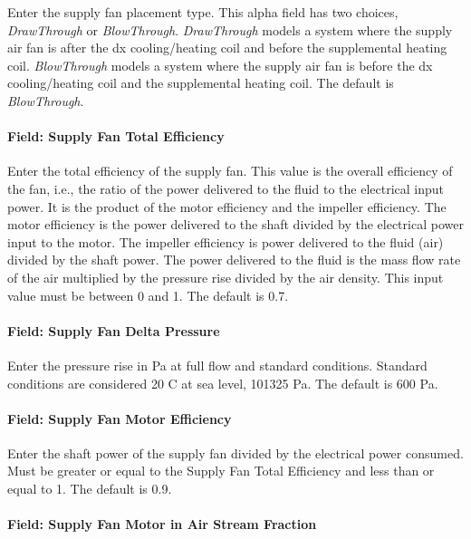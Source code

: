 Enter the supply fan placement type. This alpha field has two choices, \emph{DrawThrough} or \emph{BlowThrough}. \emph{DrawThrough} models a system where the supply air fan is after the dx cooling/heating coil and before the supplemental heating coil. \emph{BlowThrough} models a system where the supply air fan is before the dx cooling/heating coil and the supplemental heating coil. The default is \emph{BlowThrough}.

\paragraph{Field: Supply Fan Total Efficiency}\label{field-supply-fan-total-efficiency-6}

Enter the total efficiency of the supply fan. This value is the overall efficiency of the fan, i.e., the ratio of the power delivered to the fluid to the electrical input power. It is the product of the motor efficiency and the impeller efficiency. The motor efficiency is the power delivered to the shaft divided by the electrical power input to the motor. The impeller efficiency is power delivered to the fluid (air) divided by the shaft power. The power delivered to the fluid is the mass flow rate of the air multiplied by the pressure rise divided by the air density. This input value must be between 0 and 1. The default is 0.7.

\paragraph{Field: Supply Fan Delta Pressure}\label{field-supply-fan-delta-pressure-5}

Enter the pressure rise in Pa at full flow and standard conditions. Standard conditions are considered 20 C at sea level, 101325 Pa. The default is 600 Pa.

\paragraph{Field: Supply Fan Motor Efficiency}\label{field-supply-fan-motor-efficiency-6}

Enter the shaft power of the supply fan divided by the electrical power consumed. Must be greater or equal to the Supply Fan Total Efficiency and less than or equal to 1. The default is 0.9.

\paragraph{Field: Supply Fan Motor in Air Stream Fraction}\label{field-supply-fan-motor-in-air-stream-fraction-2}

